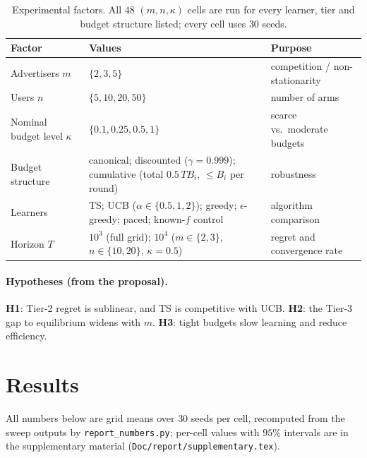 \documentclass{article}
\theoremstyle{definition}
\begin{document}
\begin{table}[t]
\caption{Experimental factors. All $48$ $(m,n,\kappa)$ cells are run for every learner, tier and budget
structure listed; every cell uses $30$ seeds.}\label{tab:design}
\centering\small
\begin{tabular}{@{}lll@{}}
\toprule
Factor & Values & Purpose\\
\midrule
Advertisers $m$ & $\{2,3,5\}$ & competition / non-stationarity\\
Users $n$ & $\{5,10,20,50\}$ & number of arms\\
Nominal budget level $\kappa$ & $\{0.1,0.25,0.5,1\}$ & scarce vs.\ moderate budgets\\
Budget structure & canonical; discounted ($\gamma=0.999$); cumulative (total $0.5\,TB_i$, $\le B_i$ per round) & robustness\\
Learners & TS; UCB ($\alpha\in\{0.5,1,2\}$); greedy; $\epsilon$-greedy; paced; known-$f$ control & algorithm comparison\\
Horizon $T$ & $10^3$ (full grid); $10^4$ ($m\in\{2,3\}$, $n\in\{10,20\}$, $\kappa=0.5$) & regret and convergence rate\\
\bottomrule
\end{tabular}
\end{table}

\paragraph{Hypotheses (from the proposal).} \textbf{H1}: Tier-2 regret is sublinear, and TS is competitive
with UCB. \textbf{H2}: the Tier-3 gap to equilibrium widens with $m$. \textbf{H3}: tight budgets slow
learning and reduce efficiency.

\section{Results}\label{sec:results}
All numbers below are grid means over $30$ seeds per cell, recomputed from the sweep outputs by
\texttt{report\_numbers.py}; per-cell values with $95\%$ intervals are in the supplementary material
(\texttt{Doc/report/supplementary.tex}).
\end{document}
